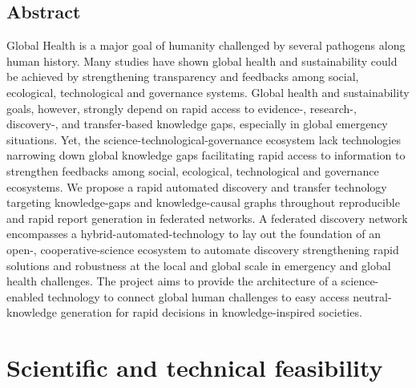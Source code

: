 \documentclass[authoryear,1p,12pt]{elsarticle}
\begin{document}
\subsection{{\bf Abstract}}
Global Health is a major goal of humanity challenged by several
pathogens along human history. Many studies have shown global health
and sustainability could be achieved by strengthening transparency and
feedbacks among social, ecological, technological and governance
systems. Global health and sustainability goals, however, strongly
depend on rapid access to evidence-, research-, discovery-, and
transfer-based knowledge gaps, especially in global emergency
situations. Yet, the science-technological-governance ecosystem lack
technologies narrowing down global knowledge gaps facilitating rapid
access to information to strengthen feedbacks among social,
ecological, technological and governance ecosystems. We propose a
rapid automated discovery and transfer technology targeting
knowledge-gaps and knowledge-causal graphs throughout reproducible and
rapid report generation in federated networks. A federated discovery
network encompasses a hybrid-automated-technology to lay out the
foundation of an open-, cooperative-science ecosystem to automate
discovery strengthening rapid solutions and robustness at the local
and global scale in emergency and global health challenges. The
project aims to provide the architecture of a science-enabled
technology to connect global human challenges to easy access
neutral-knowledge generation for rapid decisions in knowledge-inspired
societies.

\section{{\bf Scientific and technical feasibility}}
\end{document}
